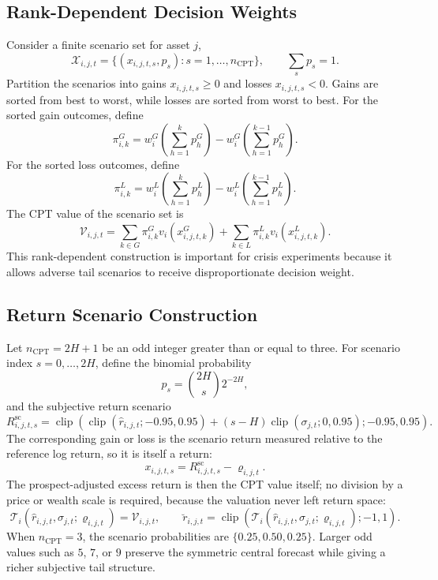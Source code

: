 \documentclass[12pt, a4paper]{article}
\DeclareMathOperator{\clip}{clip}
\begin{document}
    \subsection{Rank-Dependent Decision Weights}

    Consider a finite scenario set for asset \(j\),
    \[
        \mathcal{X}_{i,j,t}=\{(x_{i,j,t,s},p_s):s=1,\ldots,n_{\mathrm{CPT}}\},
        \qquad
        \sum_s p_s=1.
    \]
    Partition the scenarios into gains \(x_{i,j,t,s}\ge 0\) and losses
    \(x_{i,j,t,s}<0\). Gains are sorted from best to worst, while losses are sorted
    from worst to best. For the sorted gain outcomes, define
    \[
        \pi_{i,k}^{G}
        =
        w_i^G\!\left(\sum_{h=1}^{k}p_h^{G}\right)
        -
        w_i^G\!\left(\sum_{h=1}^{k-1}p_h^{G}\right).
    \]
    For the sorted loss outcomes, define
    \[
        \pi_{i,k}^{L}
        =
        w_i^L\!\left(\sum_{h=1}^{k}p_h^{L}\right)
        -
        w_i^L\!\left(\sum_{h=1}^{k-1}p_h^{L}\right).
    \]
    The CPT value of the scenario set is
    \[
        \mathcal{V}_{i,j,t}
        =
        \sum_{k\in G}\pi_{i,k}^{G}v_i(x_{i,j,t,k}^{G})
        +
        \sum_{k\in L}\pi_{i,k}^{L}v_i(x_{i,j,t,k}^{L}).
    \]
    This rank-dependent construction is important for crisis experiments because it
    allows adverse tail scenarios to receive disproportionate decision weight.

    \subsection{Return Scenario Construction}

    Let \(n_{\mathrm{CPT}}=2H+1\) be an odd integer greater than or equal to
    three. For scenario index \(s=0,\ldots,2H\), define the binomial probability
    \[
        p_s=\binom{2H}{s}2^{-2H},
    \]
    and the subjective return scenario
    \[
        R_{i,j,t,s}^{\mathrm{sc}}
        =
        \clip\!\left(
                   \clip(\hat r_{i,j,t};-0.95,0.95)
                   +(s-H)\clip(\sigma_{j,t};0,0.95);
            -0.95,0.95
        \right).
    \]
    The corresponding gain or loss is the scenario return measured relative to the
    reference log return, so it is itself a return:
    \[
        x_{i,j,t,s}=R_{i,j,t,s}^{\mathrm{sc}}-\varrho_{i,j,t}.
    \]
    The prospect-adjusted excess return is then the CPT value itself; no division
    by a price or wealth scale is required, because the valuation never left
    return space:
    \[
        \mathcal{T}_i(\hat r_{i,j,t},\sigma_{j,t};\varrho_{i,j,t})
        =
        \mathcal{V}_{i,j,t},
        \qquad
        \breve r_{i,j,t}
        =
        \clip\!\left(
                   \mathcal{T}_i(\hat r_{i,j,t},\sigma_{j,t};\varrho_{i,j,t});
            -1,1
        \right).
    \]
    When \(n_{\mathrm{CPT}}=3\), the scenario probabilities are
    \(\{0.25,0.50,0.25\}\). Larger odd values such as \(5\), \(7\), or \(9\)
    preserve the symmetric central forecast while giving a richer subjective tail
    structure.
\end{document}
